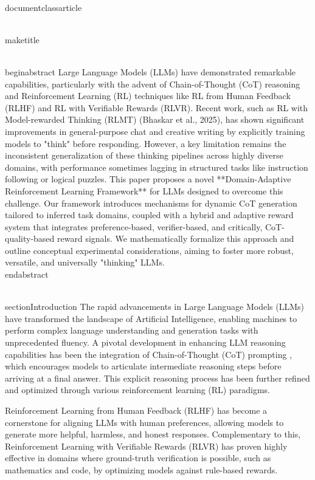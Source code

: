\\documentclass{article}
\begin{document}
\\maketitle

\\begin{abstract}
Large Language Models (LLMs) have demonstrated remarkable capabilities, particularly with the advent of Chain-of-Thought (CoT) reasoning and Reinforcement Learning (RL) techniques like RL from Human Feedback (RLHF) and RL with Verifiable Rewards (RLVR). Recent work, such as RL with Model-rewarded Thinking (RLMT) (Bhaskar et al., 2025), has shown significant improvements in general-purpose chat and creative writing by explicitly training models to "think" before responding. However, a key limitation remains the inconsistent generalization of these thinking pipelines across highly diverse domains, with performance sometimes lagging in structured tasks like instruction following or logical puzzles. This paper proposes a novel **Domain-Adaptive Reinforcement Learning Framework** for LLMs designed to overcome this challenge. Our framework introduces mechanisms for dynamic CoT generation tailored to inferred task domains, coupled with a hybrid and adaptive reward system that integrates preference-based, verifier-based, and critically, CoT-quality-based reward signals. We mathematically formalize this approach and outline conceptual experimental considerations, aiming to foster more robust, versatile, and universally "thinking" LLMs.
\\end{abstract}

\\section{Introduction}
The rapid advancements in Large Language Models (LLMs) have transformed the landscape of Artificial Intelligence, enabling machines to perform complex language understanding and generation tasks with unprecedented fluency. A pivotal development in enhancing LLM reasoning capabilities has been the integration of Chain-of-Thought (CoT) prompting \cite{wei2022chain}, which encourages models to articulate intermediate reasoning steps before arriving at a final answer. This explicit reasoning process has been further refined and optimized through various reinforcement learning (RL) paradigms.

Reinforcement Learning from Human Feedback (RLHF) \cite{ouyang2022training} has become a cornerstone for aligning LLMs with human preferences, allowing models to generate more helpful, harmless, and honest responses. Complementary to this, Reinforcement Learning with Verifiable Rewards (RLVR) \cite{lambert2025tulu} has proven highly effective in domains where ground-truth verification is possible, such as mathematics and code, by optimizing models against rule-based rewards.
\end{document}
